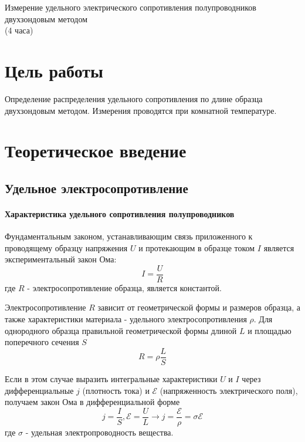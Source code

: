 \newpage

\setcounter{chapter}{1}

\begin{center}
Измерение удельного электрического сопротивления полупроводников двухзондовым методом\\
(4 часа)
\end{center}

\section{Цель работы}
Определение распределения удельного сопротивления по длине образца двухзондовым методом. Измерения проводятся при комнатной температуре.

\setcounter{chapter}{1}

\section{Теоретическое введение}
\subsection{Удельное электросопротивление}
\paragraph{Характеристика удельного сопротивления полупроводников}

Фундаментальным законом, устанавливающим связь приложенного к проводящему образцу напряжения $U$ и протекающим в образце током $I$ является экспериментальный закон Ома:
\begin{equation}
I = \frac{U}{R}
\end{equation}
где $R$ - электросопротивление образца, является константой.

Электросопротивление $R$ зависит от геометрической формы и размеров образца, а также характеристики материала - удельного электросопротивления $\rho$. Для однородного образца правильной геометрической формы длиной $L$ и площадью поперечного сечения $S$
\begin{equation}
R = \rho \frac{L}{S}
\end{equation}

Если в этом случае выразить интегральные характеристики $U$ и $I$ через дифференциальные $j$ (плотность тока) и $\mathcal{E}$ (напряженность электрического поля), получаем закон Ома в дифференциальной форме
\begin{equation}
j = \frac{I}{S}, \mathcal{E} = \frac{U}{L} \rightarrow j = \frac{\mathcal{E}}{\rho} = \sigma \mathcal{E}
\end{equation}
где $\sigma$ - удельная электропроводность вещества.

